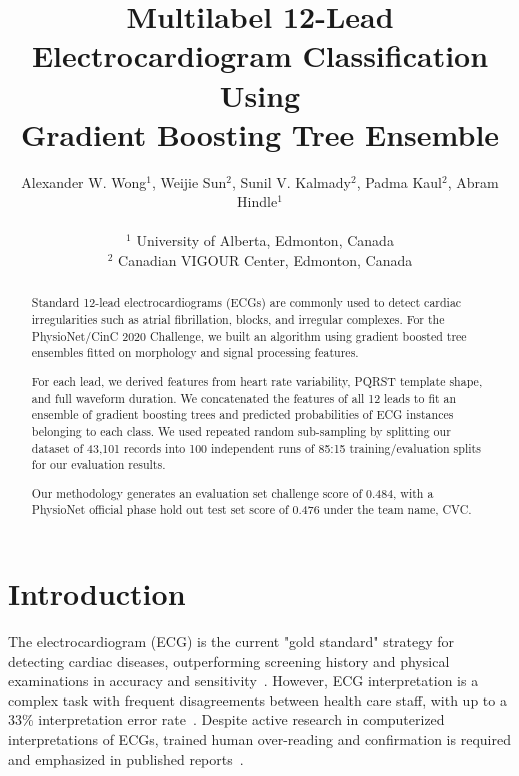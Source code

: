 \documentclass[twocolumn]{cinc}
\begin{document}


\title{Multilabel 12-Lead Electrocardiogram Classification Using \\
Gradient Boosting Tree Ensemble}

\author {Alexander W. Wong$^{1}$, Weijie Sun$^{2}$, Sunil V. Kalmady$^{2}$, Padma Kaul$^{2}$, Abram Hindle$^{1}$\\
\ \\
 $^1$ University of Alberta, Edmonton, Canada \\
$^2$ Canadian VIGOUR Center, Edmonton, Canada }

\maketitle

\begin{abstract}

Standard 12-lead electrocardiograms (ECGs) are commonly used to detect cardiac irregularities such as atrial fibrillation, blocks, and irregular complexes.
For the PhysioNet/CinC 2020 Challenge, we built an algorithm using gradient boosted tree ensembles fitted on morphology and signal processing features.

For each lead, we derived features from heart rate variability, PQRST template shape, and full waveform duration.
We concatenated the features of all 12 leads to fit an ensemble of gradient boosting trees and predicted probabilities of ECG instances belonging to each class.
We used repeated random sub-sampling by splitting our dataset of 43,101 records into 100 independent runs of 85:15 training/evaluation splits for our evaluation results.

Our methodology generates an evaluation set challenge score of 0.484, with a PhysioNet official phase hold out test set score of 0.476 under the team name, CVC.

\end{abstract}

\section{Introduction}

The electrocardiogram (ECG) is the current "gold standard" strategy for detecting cardiac diseases, outperforming screening history and physical examinations in accuracy and sensitivity~\cite{harmon_effectiveness_2015}.
However, ECG interpretation is a complex task with frequent disagreements between health care staff, with up to a 33\% interpretation error rate~\cite{mele_improving_2008}.
Despite active research in computerized interpretations of ECGs, trained human over-reading and confirmation is required and emphasized in published reports~\cite{schlapfer_computer-interpreted_2017}.
\end{document}
